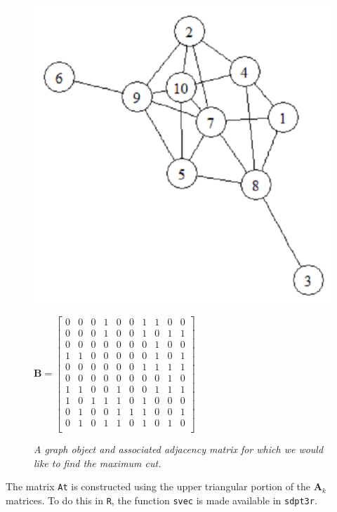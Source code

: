 \documentclass{article}
\newcommand{\m}[1]{\mathbf{#1}}               %
\begin{document}
\begin{figure}[hbtp]
\begin{minipage}{.49\textwidth}
\includegraphics[width=.8\textwidth]{MaxCutGraph}
\end{minipage}
%
\begin{minipage}{.49\textwidth}
$\m{B} = \left[
\begin{array}{cccccccccc}
0 & 0 & 0 & 1 & 0 & 0 & 1 & 1 & 0 & 0\\
0 & 0 & 0 & 1 & 0 & 0 & 1 & 0 & 1 & 1\\ 
0 & 0 & 0 & 0 & 0 & 0 & 0 & 1 & 0 & 0\\
1 & 1 & 0 & 0 & 0 & 0 & 0 & 1 & 0 & 1\\
0 & 0 & 0 & 0 & 0 & 0 & 1 & 1 & 1 & 1\\
0 & 0 & 0 & 0 & 0 & 0 & 0 & 0 & 1 & 0\\
1 & 1 & 0 & 0 & 1 & 0 & 0 & 1 & 1 & 1\\
1 & 0 & 1 & 1 & 1 & 0 & 1 & 0 & 0 & 0\\
0 & 1 & 0 & 0 & 1 & 1 & 1 & 0 & 0 & 1\\
0 & 1 & 0 & 1 & 1 & 0 & 1 & 0 & 1 & 0\\
\end{array} \right]$
\end{minipage}
\caption{\emph{A graph object and associated adjacency matrix for which we would like to find the maximum cut.}}
\label{fig:maxcut}
\end{figure}

The matrix \verb!At! is constructed using the upper triangular portion of the $\m{A}_{k}$ matrices. To do this in \verb!R!, the function \verb!svec! is made available in \verb!sdpt3r!.
\end{document}
